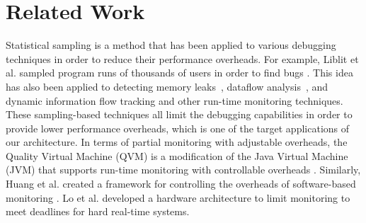\section{Related Work}
\label{sec:related}


 

Statistical sampling is a method that has been applied to various debugging
techniques in order to reduce their performance overheads. For example, Liblit
et al. sampled program runs of thousands of users in order to find bugs
\cite{liblit-pldi05}. This idea has also been applied to detecting memory
leaks~\cite{chilimbi-asplos04}, dataflow analysis~\cite{greathouse-cgo11}, and dynamic information flow tracking\cite{testudo-micro08} and
other run-time monitoring techniques. 
These sampling-based techniques all limit the debugging capabilities in order
to provide lower performance overheads, which is one of the target applications of our architecture.
In terms of partial monitoring with adjustable overheads, the Quality Virtual Machine (QVM) is a
modification of the Java Virtual Machine (JVM) that supports run-time
monitoring with controllable overheads \cite{qvm-oopsla08}. Similarly, Huang et
al. created a framework for controlling the overheads of software-based
monitoring \cite{huang-sttt12}. 
Lo et al. \cite{lo-rtas14} developed a hardware architecture to limit
monitoring to meet deadlines for hard real-time systems.

